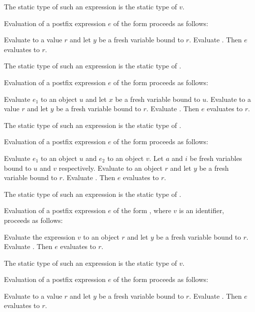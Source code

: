 \documentclass{article}
\begin{document}
\LMHash{}
The static type of such an expression is the static type of $v$.


\LMHash{}
Evaluation of a postfix expression $e$ of the form 
proceeds as follows:

\LMHash{}
Evaluate  to a value $r$
and let $y$ be a fresh variable bound to $r$.
Evaluate .
Then $e$ evaluates to $r$.

\LMHash{}
The static type of such an expression is the static type of .

\LMHash{}
Evaluation of a postfix expression $e$ of the form 
proceeds as follows:

\LMHash{}
Evaluate $e_1$ to an object $u$ and let $x$ be a fresh variable bound to $u$.
Evaluate  to a value $r$
and let $y$ be a fresh variable bound to $r$.
Evaluate .
Then $e$ evaluates to $r$.

\LMHash{}
The static type of such an expression is the static type of .

\LMHash{}
Evaluation of a postfix expression $e$ of the form 
proceeds as follows:

\LMHash{}
Evaluate $e_1$ to an object $u$ and $e_2$ to an object $v$.
Let $a$ and $i$ be fresh variables bound to $u$ and $v$ respectively.
Evaluate  to an object $r$
and let $y$ be a fresh variable bound to $r$.
Evaluate .
Then $e$ evaluates to $r$.

\LMHash{}
The static type of such an expression is the static type of .

\LMHash{}
Evaluation of a postfix expression $e$ of the form , where $v$ is an identifier, proceeds as follows:

\LMHash{}
Evaluate the expression $v$ to an object $r$
and let $y$ be a fresh variable bound to $r$.
Evaluate .
Then $e$ evaluates to $r$.

\LMHash{}
The static type of such an expression is the static type of $v$.

\LMHash{}
Evaluation of a postfix expression $e$ of the form 
proceeds as follows:

\LMHash{}
Evaluate  to a value $r$
and let $y$ be a fresh variable bound to $r$.
Evaluate .
Then $e$ evaluates to $r$.
\end{document}
